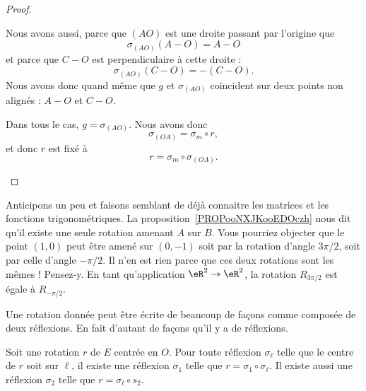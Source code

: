 \begin{proof}
\begin{subproof}
\begin{subproof}
			Nous avons aussi, parce que \( (AO)\) est une droite passant par l'origine que
			\begin{equation}
				\sigma_{(AO)}(A-O)=A-O
			\end{equation}
			et parce que \( C-O\) est perpendiculaire à cette droite :
			\begin{equation}
				\sigma_{(AO)}(C-O)=-(C-O).
			\end{equation}
			Nous avons donc quand même que \( g\) et \( \sigma_{(AO)}\) coïncident sur deux points non alignés : \( A-O\) et \( C-O\).
		\end{subproof}

		Dans tous le cas, \( g=\sigma_{(AO)}\). Nous avons donc
		\begin{equation}
			\sigma_{(OA)}=\sigma_m\circ r,
		\end{equation}
		et donc \( r\) est fixé à
		\begin{equation}
			r=\sigma_m\circ\sigma_{(OA)}.
		\end{equation}
	\end{subproof}
\end{proof}

\begin{normaltext}
	Anticipons un peu et faisons semblant de déjà connaitre les matrices et les fonctions trigonométriques. La proposition~\ref{PROPooNXJKooEDOczh} nous dit qu'il existe une seule rotation amenant \( A\) sur \( B\). Vous pourriez objecter que le point \( (1,0)\) peut être amené sur \( (0,-1)\) soit par la rotation d'angle \( 3\pi/2\), soit par celle d'angle \( -\pi/2\). Il n'en est rien parce que ces deux rotations sont les mêmes ! Pensez-y. En tant qu'application \( \eR^2\to \eR^2\), la rotation \( R_{3\pi/2}\) est égale à \( R_{-\pi/2}\).
\end{normaltext}

Une rotation donnée peut être écrite de beaucoup de façons comme composée de deux réflexions. En fait d'autant de façons qu'il y a de réflexions.
\begin{proposition}      \label{PROPooKAZEooLTHWKe}
	Soit une rotation \( r\) de \( E\) centrée en \( O\). Pour toute réflexion \( \sigma_{\ell}\) telle que le centre de \( r\) soit sur \( \ell\), il existe une réflexion \( \sigma_1\) telle que \( r=\sigma_1\circ\sigma_{\ell}\). Il existe aussi une réflexion \( \sigma_2\) telle que \( r=\sigma_{\ell}\circ s_2\).
\end{proposition}

